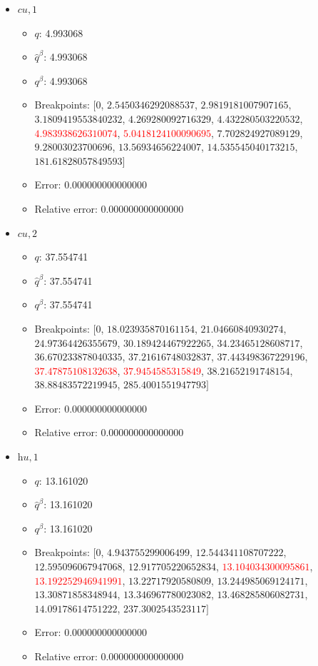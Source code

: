 \documentclass{article}%
\begin{document}
\begin{itemize}
\begin{itemize}
		\item Error: 0.000000000000000%
		\item Relative error: 0.000000000000000%
	\end{itemize}%
	\item $\textit{cu},1$%
	\begin{itemize}%
		\item $q$: 4.993068%
		\item $\hat{q}^\beta$: 4.993068%
		\item $q^\beta$: 4.993068%
		\item Breakpoints: $[$$0$, $2.5450346292088537$, $2.9819181007907165$, $3.1809419553840232$, $4.269280092716329$, $4.432280503220532$, \textcolor{red}{$4.983938626310074$}, \textcolor{red}{$5.0418124100090695$}, $7.702824927089129$, $9.28003023700696$, $13.56934656224007$, $14.535545040173215$, $181.61828057849593$$]$%
		\item Error: 0.000000000000000%
		\item Relative error: 0.000000000000000%
	\end{itemize}%
	\item $\textit{cu},2$%
	\begin{itemize}%
		\item $q$: 37.554741%
		\item $\hat{q}^\beta$: 37.554741%
		\item $q^\beta$: 37.554741%
		\item Breakpoints: $[$$0$, $18.023935870161154$, $21.04660840930274$, $24.97364426355679$, $30.189424467922265$, $34.23465128608717$, $36.670233878040335$, $37.21616748032837$, $37.443498367229196$, \textcolor{red}{$37.47875108132638$}, \textcolor{red}{$37.9454585315849$}, $38.21652191748154$, $38.88483572219945$, $285.4001551947793$$]$%
		\item Error: 0.000000000000000%
		\item Relative error: 0.000000000000000%
	\end{itemize}%
	\item $\textit{hu},1$%
	\begin{itemize}%
		\item $q$: 13.161020%
		\item $\hat{q}^\beta$: 13.161020%
		\item $q^\beta$: 13.161020%
		\item Breakpoints: $[$$0$, $4.943755299006499$, $12.544341108707222$, $12.595096067947068$, $12.917705220652834$, \textcolor{red}{$13.104034300095861$}, \textcolor{red}{$13.192252946941991$}, $13.22717920580809$, $13.244985069124171$, $13.30871858348944$, $13.346967780023082$, $13.468285806082731$, $14.09178614751222$, $237.3002543523117$$]$%
		\item Error: 0.000000000000000%
		\item Relative error: 0.000000000000000%
	\end{itemize}%
\end{itemize}%
\end{document}
